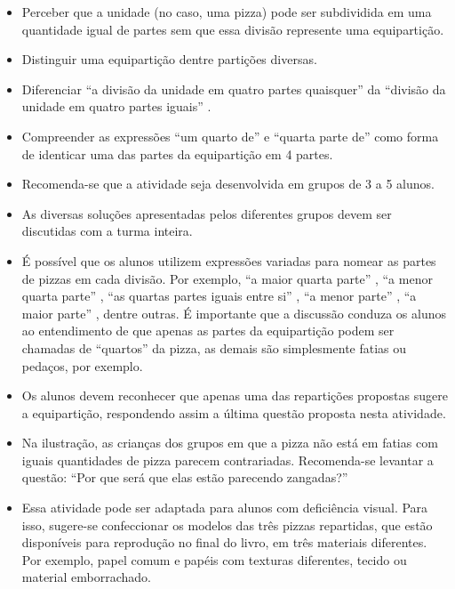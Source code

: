 \begin{multicols}{2}
\begin{itemize} %
    \item       Perceber que a unidade (no caso, uma pizza) pode ser subdividida em uma quantidade igual de partes sem que essa divisão represente uma equipartição.
    \item       Distinguir uma equipartição dentre partições diversas.
    \item       Diferenciar       ``a divisão da unidade em quatro partes quaisquer''       da       ``divisão da unidade em quatro partes iguais''      .
    \item       Compreender as expressões ``um quarto de'' e ``quarta parte de'' como forma de identicar uma das partes da equipartição em 4 partes.
\end{itemize} %
 \vspace{.1cm}

   \vspace{.1cm}

\begin{itemize} %
    \item       Recomenda-se que a atividade seja desenvolvida em grupos de 3 a 5 alunos.
    \item       As diversas soluções apresentadas pelos diferentes grupos devem ser discutidas com a turma inteira.
    \item       É possível que os alunos utilizem expressões variadas para nomear as partes de pizzas em cada divisão. Por exemplo,       ``a maior quarta parte''      ,       ``a menor quarta parte''      ,       ``as quartas partes iguais entre si''      ,       ``a menor parte''      ,       ``a maior parte''      , dentre outras. É importante que a discussão conduza os alunos ao entendimento de que apenas as partes da equipartição podem ser chamadas de       ``quartos''       da pizza, as demais são simplesmente fatias ou pedaços, por exemplo.
    \item       Os alunos devem reconhecer que apenas uma das repartições propostas sugere a equipartição, respondendo assim a última questão proposta nesta atividade.
    \item       Na ilustração, as crianças dos grupos em que a pizza não está em fatias com iguais quantidades de pizza parecem contrariadas. Recomenda-se levantar a questão:       ``Por que será que elas estão parecendo zangadas?''
    \item       Essa atividade pode ser adaptada para alunos com deficiência visual. Para isso, sugere-se confeccionar os modelos das três pizzas repartidas, que estão disponíveis para reprodução no final do livro, em três materiais diferentes. Por exemplo, papel comum e papéis com texturas diferentes, tecido ou material emborrachado.
\end{itemize} %



\end{multicols}
